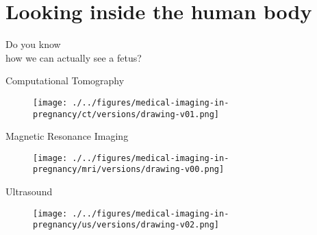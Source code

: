 \section{Looking inside the human body}


{
\begin{frame}{}

\BigSizeFont
\begin{center}
    Do you know \\
    how we can actually see a fetus?
\end{center}


\end{frame}
}


{
\begin{frame}{Computational Tomography}
      \begin{figure}
        \centering
        \texttt{[image: ./../figures/medical-imaging-in-pregnancy/ct/versions/drawing-v01.png]}
      \end{figure}
\end{frame}
}


{
\begin{frame}{Magnetic Resonance Imaging}
      \begin{figure}
        \centering
        \texttt{[image: ./../figures/medical-imaging-in-pregnancy/mri/versions/drawing-v00.png]}
      \end{figure}
\end{frame}
}


{
\begin{frame}{Ultrasound}
      \begin{figure}
        \centering
        \texttt{[image: ./../figures/medical-imaging-in-pregnancy/us/versions/drawing-v02.png]}
      \end{figure}
\end{frame}
}


